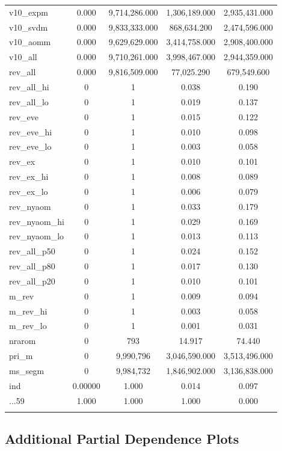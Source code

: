 \documentclass[11pt,]{article}
\begin{document}
\begin{table}[!htbp]
\begin{tabular}{@{\extracolsep{5pt}}lcccc}
v10\_expm & 0.000 & 9,714,286.000 & 1,306,189.000 & 2,935,431.000 \\
v10\_svdm & 0.000 & 9,833,333.000 & 868,634.200 & 2,474,596.000 \\
v10\_aomm & 0.000 & 9,629,629.000 & 3,414,758.000 & 2,908,400.000 \\
v10\_all & 0.000 & 9,710,261.000 & 3,998,467.000 & 2,944,359.000 \\
rev\_all & 0.000 & 9,816,509.000 & 77,025.290 & 679,549.600 \\
rev\_all\_hi & 0 & 1 & 0.038 & 0.190 \\
rev\_all\_lo & 0 & 1 & 0.019 & 0.137 \\
rev\_eve & 0 & 1 & 0.015 & 0.122 \\
rev\_eve\_hi & 0 & 1 & 0.010 & 0.098 \\
rev\_eve\_lo & 0 & 1 & 0.003 & 0.058 \\
rev\_ex & 0 & 1 & 0.010 & 0.101 \\
rev\_ex\_hi & 0 & 1 & 0.008 & 0.089 \\
rev\_ex\_lo & 0 & 1 & 0.006 & 0.079 \\
rev\_nyaom & 0 & 1 & 0.033 & 0.179 \\
rev\_nyaom\_hi & 0 & 1 & 0.029 & 0.169 \\
rev\_nyaom\_lo & 0 & 1 & 0.013 & 0.113 \\
rev\_all\_p50 & 0 & 1 & 0.024 & 0.152 \\
rev\_all\_p80 & 0 & 1 & 0.017 & 0.130 \\
rev\_all\_p20 & 0 & 1 & 0.010 & 0.101 \\
m\_rev & 0 & 1 & 0.009 & 0.094 \\
m\_rev\_hi & 0 & 1 & 0.003 & 0.058 \\
m\_rev\_lo & 0 & 1 & 0.001 & 0.031 \\
nrarom & 0 & 793 & 14.917 & 74.440 \\
pri\_m & 0 & 9,990,796 & 3,046,590.000 & 3,513,496.000 \\
ms\_segm & 0 & 9,984,732 & 1,846,902.000 & 3,136,838.000 \\
ind & 0.00000 & 1.000 & 0.014 & 0.097 \\
...59 & 1.000 & 1.000 & 1.000 & 0.000 \\
\hline \\[-1.8ex]
\end{tabular}
\end{table}

\restoregeometry

\hypertarget{additional-partial-dependence-plots}{%
\subsection{\texorpdfstring{Additional Partial Dependence Plots
\label{chap:ap2}}{Additional Partial Dependence Plots }}\label{additional-partial-dependence-plots}}
\end{document}
